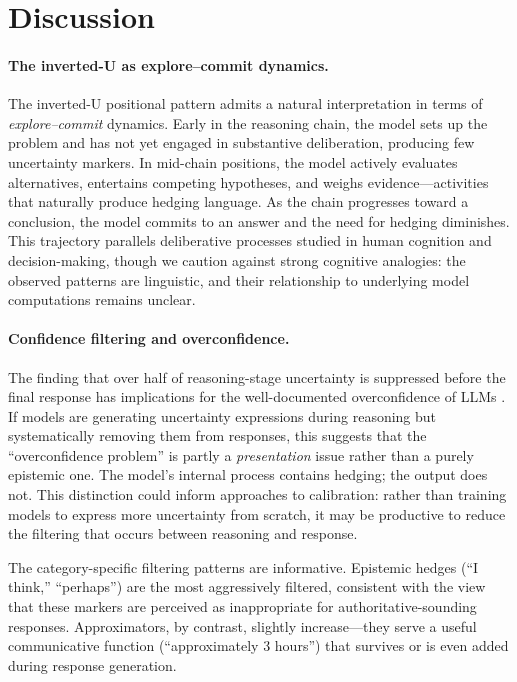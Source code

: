\section{Discussion}

\paragraph{The inverted-U as explore--commit dynamics.}
The inverted-U positional pattern admits a natural interpretation in terms of \emph{explore--commit} dynamics. Early in the reasoning chain, the model sets up the problem and has not yet engaged in substantive deliberation, producing few uncertainty markers. In mid-chain positions, the model actively evaluates alternatives, entertains competing hypotheses, and weighs evidence---activities that naturally produce hedging language. As the chain progresses toward a conclusion, the model commits to an answer and the need for hedging diminishes. This trajectory parallels deliberative processes studied in human cognition and decision-making, though we caution against strong cognitive analogies: the observed patterns are linguistic, and their relationship to underlying model computations remains unclear.

\paragraph{Confidence filtering and overconfidence.}
The finding that over half of reasoning-stage uncertainty is suppressed before the final response has implications for the well-documented overconfidence of LLMs \citep{mielke2022reducing, zhou2024relying}. If models are generating uncertainty expressions during reasoning but systematically removing them from responses, this suggests that the ``overconfidence problem'' is partly a \emph{presentation} issue rather than a purely epistemic one. The model's internal process contains hedging; the output does not. This distinction could inform approaches to calibration: rather than training models to express more uncertainty from scratch, it may be productive to reduce the filtering that occurs between reasoning and response.

The category-specific filtering patterns are informative. Epistemic hedges (``I think,'' ``perhaps'') are the most aggressively filtered, consistent with the view that these markers are perceived as inappropriate for authoritative-sounding responses. Approximators, by contrast, slightly increase---they serve a useful communicative function (``approximately 3 hours'') that survives or is even added during response generation.

